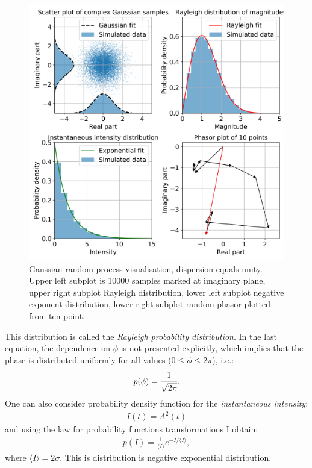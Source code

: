     \begin{figure}[h!]
    	\centering
        \includegraphics[width=0.75\linewidth]{content/images/Statistical_Optics/gaussian_process.png}
        \captionsetup{justification=centering}
        \caption{Gaussian random process visualisation, dispersion equals unity. Upper left subplot is 10000 samples marked at imaginary plane, upper right subplot Rayleigh distribution, lower left subplot negative exponent distribution, lower right subplot random phasor plotted from ten point.}
        \label{Fig:gaussian_process}
    \end{figure}
    This distribution is called the \textit{Rayleigh probability distribution}. In the last equation, the dependence on $\phi$ is not presented explicitly, which implies that the phase is distributed uniformly for all values ($0 \leq \phi \leq 2 \pi$), i.e.:
    \begin{align}
        p(\phi) = \cfrac{1}{\sqrt{2 \pi}}.
    \end{align}
    One can also consider probability density function for the \textit{instantaneous intensity}:
    \begin{align}
        I(t) = A^2(t)
    \end{align}
    and using the law for probability functions transformations I obtain:
    \begin{align}
        p(I) = \frac{1}{\langle I \rangle} e^{-I/\langle I \rangle},
    \end{align}
    where $\langle I \rangle = 2 \sigma$. This is distribution is negative exponential distribution. 


